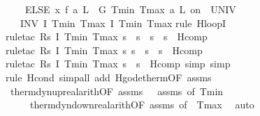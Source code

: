 \documentclass[envcountsame]{llncs}
\begin{document}
\begin{example}
\begin{isabellebody}
\ \ \ \ ELSE\ {\isacharparenleft}x{\isasymacute}{\isacharequal}\ f\ a\ L\ {\isacharampersand}\ G\ Tmin\ Tmax\ a\ L\ on\ {\isacharbraceleft}{}{\isachardot}{\isachardot}{\isasymtau}{\isacharbraceright}\ UNIV\ {\isacharat}\ {}{\isacharparenright}{\isacharparenright}\isanewline
\ \ {\isacharparenright}\ INV\ I\ Tmin\ Tmax{\isacharparenright}\ {\isasymlceil}I\ Tmin\ Tmax{\isasymrceil}{\isachardoublequoteclose}\isanewline
{}\isamarkupfalse%
{\isacharparenleft}rule\ H{\isacharunderscore}loopI{\isacharparenright}\isanewline
\ \ \ \ \isamarkupfalse%
{\isacharparenleft}rule{\isacharunderscore}tac\ R{\isacharequal}{\isachardoublequoteopen}{\isasymlambda}s{\isachardot}\ I\ Tmin\ Tmax\ s\ {\isasymand}\ s{\isachardollar}{}{\isacharequal}{}\ {\isasymand}\ s{\isachardollar}{}\ {\isacharequal}\ s{\isachardollar}{}{\isachardoublequoteclose}\ \ H{\isacharunderscore}comp{\isacharparenright}\isanewline
\ \ \ \ \ \isamarkupfalse%
{\isacharparenleft}rule{\isacharunderscore}tac\ R{\isacharequal}{\isachardoublequoteopen}{\isasymlambda}s{\isachardot}\ I\ Tmin\ Tmax\ s{\isasymand}\ s{\isachardollar}{}{\isacharequal}{}\ {\isasymand}\ s{\isachardollar}{}\ {\isacharequal}\ s{\isachardollar}{}{\isachardoublequoteclose}\ \ H{\isacharunderscore}comp{\isacharparenright}\isanewline
\ \ \ \ \ \ \isamarkupfalse%
{\isacharparenleft}rule{\isacharunderscore}tac\ R{\isacharequal}{\isachardoublequoteopen}{\isasymlambda}s{\isachardot}\ I\ Tmin\ Tmax\ s\ {\isasymand}\ s{\isachardollar}{}{\isacharequal}{}{\isachardoublequoteclose}\ \ H{\isacharunderscore}comp{\isacharcomma}\ simp{\isacharcomma}\ simp{\isacharparenright}\isanewline
\ \ \ \ \ \ \isamarkupfalse%
{\isacharparenleft}rule\ H{\isacharunderscore}cond{\isacharcomma}\ simp{\isacharunderscore}all\ add{\isacharcolon}\ H{\isacharunderscore}g{\isacharunderscore}ode{\isacharunderscore}therm{\isacharbrackleft}OF\ assms{\isacharparenleft}{}{\isacharcomma}{}{\isacharparenright}{\isacharbrackright}{\isacharparenright}{\isacharplus}\isanewline
\ \ \isamarkupfalse%
\ therm{\isacharunderscore}dyn{\isacharunderscore}up{\isacharunderscore}real{\isacharunderscore }arith{\isacharbrackleft}OF\ assms{\isacharparenleft}{}{\isacharparenright}\ {\isacharunderscore}\ {\isacharunderscore}\ assms{\isacharparenleft}{}{\isacharparenright}{\isacharcomma}\ of\ Tmin{\isacharbrackright}\isanewline
\ \ \ \ \ therm{\isacharunderscore}dyn{\isacharunderscore}down{\isacharunderscore }real{\isacharunderscore}arith{\isacharbrackleft}OF\ assms{\isacharparenleft}{}{\isacharcomma}{}{\isacharparenright}{\isacharcomma}\ of\ {\isacharunderscore}\ Tmax{\isacharbrackright}\ \isamarkupfalse%
\ auto\isanewline
\end{isabellebody}


\end{example}
\end{document}
